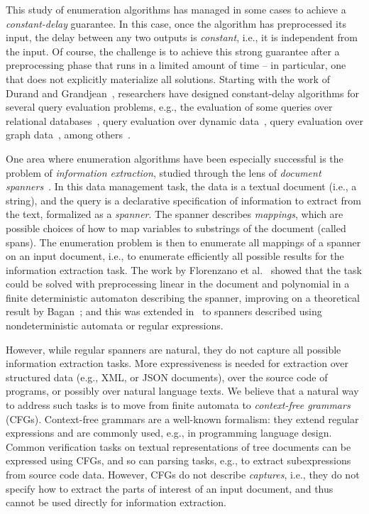 This study of enumeration algorithms has managed in some cases to achieve a
\emph{constant-delay} guarantee. In this case, once the algorithm has
preprocessed its input, the delay between any two outputs is \emph{constant},
i.e., it is independent from the input. Of course, the challenge is to achieve
this strong guarantee after a preprocessing phase that runs in a limited amount
of time -- in particular, one that does not explicitly materialize all solutions.
%
Starting with the work of Durand and Grandjean~\cite{durand2007first}, researchers have designed
constant-delay algorithms for several query evaluation problems, e.g., the evaluation of some queries over relational databases~\cite{bagan2007acyclic,kara2020trade}, query evaluation over dynamic data~\cite{berkholz2017answering,idris2017dynamic}, query evaluation over graph data~\cite{hartig2018semantics,kroll2016complexity}, among others~\cite{Segoufin13}. 

One area where enumeration algorithms have been especially successful is the problem of \emph{information extraction}, studied through the lens of \emph{document spanners}~\cite{FaginKRV15}. In this data management task, the data is a textual document (i.e., a string), and the query is a declarative specification of information to extract from the text, formalized as a \emph{spanner}. The spanner describes \emph{mappings}, which are possible choices of how to map variables to substrings of the document (called spans). The enumeration problem is then to enumerate all mappings of a spanner on an input document, i.e., to enumerate efficiently all possible results for the information extraction task.
%
The work by Florenzano et al.~\cite{FlorenzanoRUVV18} showed that the task could be solved with preprocessing linear in the document and polynomial in a finite deterministic automaton describing the spanner, improving on a theoretical result by Bagan~\cite{bagan2006mso}; and 
this was extended in~\cite{amarilli2019constant} to spanners described using nondeterministic automata or regular expressions.

However, while regular spanners are natural, they do not capture all
possible information extraction tasks. More
expressiveness is needed for extraction over structured data (e.g., XML,
or JSON documents), over the source code of programs, or possibly over
natural language texts. We believe that a natural way to address such
tasks is to move from finite automata to \emph{context-free grammars}
(CFGs). Context-free grammars are a well-known formalism: they extend regular
expressions and are commonly used, e.g., in programming language
design. Common verification tasks on textual representations of tree
documents can be expressed using CFGs, and so can parsing tasks, e.g.,
to extract subexpressions from source code data. However, CFGs do not
describe \emph{captures}, i.e., they do not specify how to extract the
parts of interest of an input document, and thus cannot be used
directly for information extraction.

